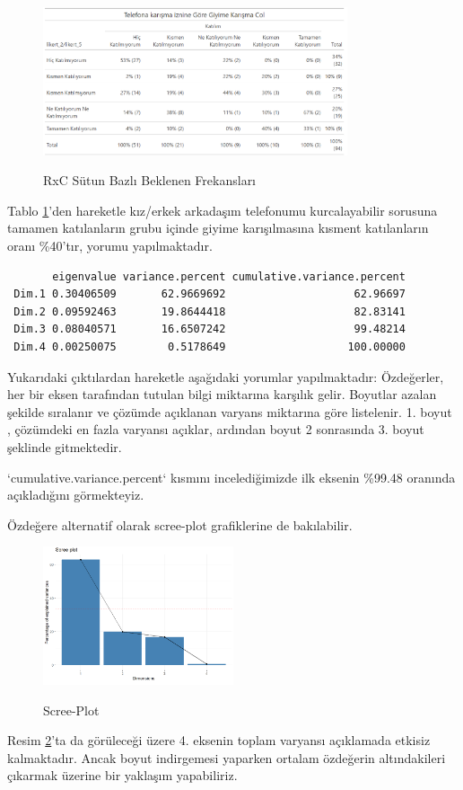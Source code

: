 \documentclass{article}
\begin{document}
\begin{figure}[htbp]
    \centering
    \caption{RxC Sütun Bazlı Beklenen Frekansları}
    \includegraphics[width=0.8\textwidth]{Imgs/RxC table3.png}
    \label{rxc-table3}
\end{figure}
Tablo \ref{rxc-table3}'den hareketle kız/erkek arkadaşım telefonumu kurcalayabilir sorusuna tamamen katılanların grubu içinde giyime karışılmasına kısment katılanların oranı \%40'tır, yorumu yapılmaktadır.

\begin{verbatim}
       eigenvalue variance.percent cumulative.variance.percent
 Dim.1 0.30406509       62.9669692                    62.96697
 Dim.2 0.09592463       19.8644418                    82.83141
 Dim.3 0.08040571       16.6507242                    99.48214
 Dim.4 0.00250075        0.5178649                   100.00000
\end{verbatim}

Yukarıdaki çıktılardan hareketle aşağıdaki yorumlar yapılmaktadır:
Özdeğerler, her bir eksen tarafından tutulan bilgi miktarına karşılık gelir. Boyutlar azalan şekilde sıralanır ve çözümde açıklanan varyans miktarına göre listelenir. 1. boyut , çözümdeki en fazla varyansı açıklar, ardından boyut 2 sonrasında 3. boyut şeklinde gitmektedir.

`cumulative.variance.percent` kısmını incelediğimizde ilk eksenin \%99.48 oranında açıkladığını görmekteyiz.

Özdeğere alternatif olarak scree-plot grafiklerine de bakılabilir.

\begin{figure}[htbp]
    \centering
    \caption{Scree-Plot}
    \includegraphics[width=0.5\textwidth]{Imgs/scree-plot.png}
    \label{scree-plot}
\end{figure}
Resim \ref{scree-plot}'ta da görüleceği üzere 4. eksenin toplam varyansı açıklamada etkisiz kalmaktadır. Ancak boyut indirgemesi yaparken ortalam özdeğerin altındakileri çıkarmak üzerine bir yaklaşım yapabiliriz.
\end{document}
